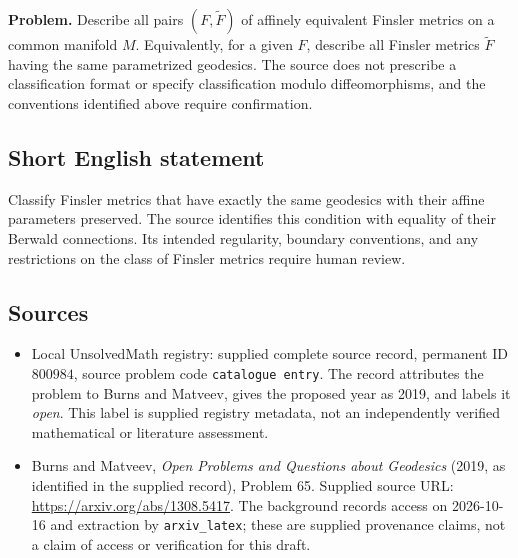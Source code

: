 \documentclass[11pt]{article}
\begin{document}
\textbf{Problem.} Describe all pairs \((F,\widetilde F)\) of affinely equivalent Finsler metrics on a common manifold \(M\). Equivalently, for a given \(F\), describe all Finsler metrics \(\widetilde F\) having the same parametrized geodesics. The source does not prescribe a classification format or specify classification modulo diffeomorphisms, and the conventions identified above require confirmation.
\subsection{Short English statement}
Classify Finsler metrics that have exactly the same geodesics with their affine parameters preserved. The source identifies this condition with equality of their Berwald connections. Its intended regularity, boundary conventions, and any restrictions on the class of Finsler metrics require human review.
\subsection{Sources}
\begin{itemize}
\item Local UnsolvedMath registry: supplied complete source record, permanent ID \(800984\), source problem code \texttt{catalogue entry}. The record attributes the problem to Burns and Matveev, gives the proposed year as 2019, and labels it \emph{open}. This label is supplied registry metadata, not an independently verified mathematical or literature assessment.
\item Burns and Matveev, \emph{Open Problems and Questions about Geodesics} (2019, as identified in the supplied record), Problem 65. Supplied source URL: \url{https://arxiv.org/abs/1308.5417}. The background records access on 2026-10-16 and extraction by \texttt{arxiv\_latex}; these are supplied provenance claims, not a claim of access or verification for this draft.
\end{itemize}
\end{document}

